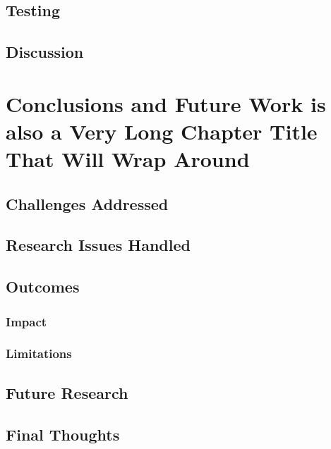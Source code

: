 \documentclass[12pt]{report}	%
\begin{document}
	\section{Testing}
	\section{Discussion}
	
\chapter{Conclusions and Future Work is also a Very Long Chapter Title That Will Wrap Around}
	\section{Challenges Addressed}
	\section{Research Issues Handled}
	\section{Outcomes}
		\subsection{Impact}
		\subsection{Limitations}
	\section{Future Research}
	\section{Final Thoughts}

%	

%	

	
%
%
\appendices

%

%
\end{document}
